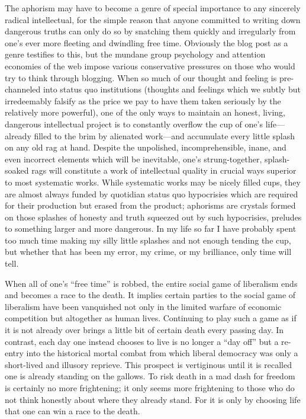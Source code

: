 \documentclass[12pt, twocolumn, oneside]{article}  	%
\begin{document}
\newpage


The aphorism may have to become a genre of special importance to any sincerely radical intellectual, for the simple reason that anyone committed to writing down dangerous truths can only do so by snatching them quickly and irregularly from one's ever more fleeting and dwindling free time. Obviously the blog post as a genre testifies to this, but the mundane group psychology and attention economies of the web impose various conservative pressures on those who would try to think through blogging. When so much of our thought and feeling is pre-channeled into status quo institutions (thoughts and feelings which we subtly but irredeemably falsify as the price we pay to have them taken seriously by the relatively more powerful), one of the only ways to maintain an honest, living, dangerous intellectual project is to constantly overflow the cup of one's life---already filled to the brim by alienated work---and accumulate every little splash on any old rag at hand. Despite the unpolished, incomprehensible, inane, and even incorrect elements which will be inevitable, one's strung-together, splash-soaked rags will constitute a work of intellectual quality in crucial ways superior to most systematic works. While systematic works may be nicely filled cups, they are almost always funded by quotidian status quo hypocrisies which are required for their production but erased from the product; aphorisms are crystals formed on those splashes of honesty and truth squeezed out by such hypocrisies, preludes to something larger and more dangerous. In my life so far I have probably spent too much time making my silly little splashes and not enough tending the cup, but whether that has been my error, my crime, or my brilliance, only time will tell.

\newpage

\setcounter{page}{10}
\renewcommand{\thepage}{\arabic{page}}

When all of one's ``free time'' is robbed, the entire social game of liberalism ends and becomes a race to the death. It implies certain parties to the social game of liberalism have been vanquished not only in the limited warfare of economic competition but altogether as human lives. Continuing to play such a game as if it is not already over brings a little bit of certain death every passing day. In contrast, each day one instead chooses to live is no longer a ``day off'' but a re-entry into the historical mortal combat from which liberal democracy was only a short-lived and illusory reprieve. This prospect is vertiginous until it is recalled one is already standing on the gallows. To risk death in a mad dash for freedom is certainly no more frightening; it only seems more frightening to those who do not think honestly about where they already stand. For it is only by choosing life that one can win a race to the death.
\end{document}
